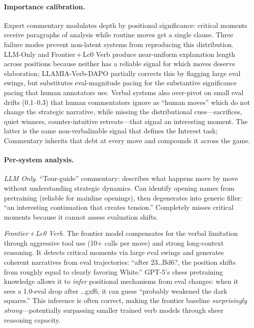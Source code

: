 \paragraph{Importance calibration.}
Expert commentary modulates depth by positional significance: critical
moments receive paragraphs of analysis while routine moves get a single
clause.
Three failure modes prevent non-latent systems from reproducing this
distribution.
LLM-Only and Frontier\,+\,Lc0 Verb produce near-uniform explanation
length across positions because neither has a reliable signal for which
moves deserve elaboration; LLAMIA-Verb-DAPO partially corrects this by
flagging large eval swings, but substitutes eval-magnitude pacing for
the substantive significance pacing that human annotators use.
Verbal systems also over-pivot on small eval drifts (0.1--0.3) that
human commentators ignore as ``human moves'' which do not change the
strategic narrative, while missing the distributional cues---sacrifices,
quiet winners, counter-intuitive retreats---that signal an interesting
moment.
The latter is the same non-verbalizable signal that defines the
Interest task; Commentary inherits that debt at every move and
compounds it across the game.

\paragraph{Per-system analysis.}

\emph{LLM Only.}
``Tour-guide'' commentary: describes what happens move by move without
understanding strategic dynamics.
Can identify opening names from pretraining (reliable for mainline
openings), then degenerates into generic filler: ``an interesting
continuation that creates tension.''
Completely misses critical moments because it cannot assess evaluation
shifts.

\emph{Frontier\,+\,Lc0 Verb.}
The frontier model compensates for the verbal limitation through aggressive
tool use (10+ calls per move) and strong long-context reasoning.
It detects critical moments via large eval swings and generates coherent
narratives from eval trajectories: ``after 23\ldots{}Bd6?, the position
shifts from roughly equal to clearly favoring White.''
GPT-5's chess pretraining knowledge allows it to \emph{infer} positional
mechanisms from eval changes: when it sees a 1.0-eval drop after
\ldots{}gxf6, it can guess ``probably weakened the dark squares.''
This inference is often correct, making the frontier baseline
\emph{surprisingly strong}---potentially surpassing smaller trained verb
models through sheer reasoning capacity.

